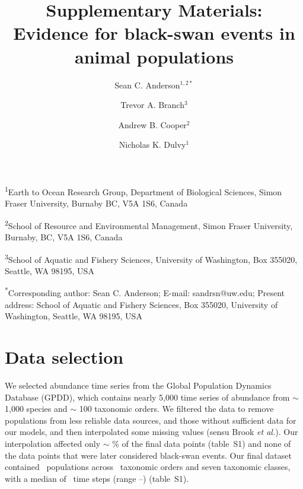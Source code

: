\documentclass[12pt]{article}
\title{Supplementary Materials:\\Evidence for black-swan events in animal
  populations}
\author{
Sean C. Anderson$^{1,2*}$ \and
Trevor A. Branch$^3$ \and
Andrew B. Cooper$^2$ \and
Nicholas K. Dulvy$^1$
}
\date{}
\begin{document}
\nocite{taleb2007,sornette2009}
\nocite{meehl2004,katz2005,ipcc2012}
\nocite{taleb2007,sornette2009,may2008}
\nocite{taleb2007}
\nocite{newman2005}
\nocite{sornette2009}
\nocite{harnik2012}
\nocite{fey2015}
\nocite{mangel1994}
\nocite{ipcc2012}
\nocite{keitt1998,allen2001,halley2002}
\nocite{brook2006a,knape2012}
\nocite{SOM}
\nocite{saucy1994}
\nocite{stafford1971}
\nocite{stafford1971}
\nocite{potts1980}
\nocite{potts1980}
\nocite{allen2001}
\nocite{schindler2010}
\nocite{carpenter2006}
\nocite{nunez2012}
\nocite{meehl2004,katz2005,ipcc2012}
\nocite{kirby2009}
\nocite{denny2009}
\nocite{nrc2007}
\nocite{caddy1996}
\nocite{schindler2010}
\nocite{doak2008,lindenmayer2010}
\nocite{mangel1994}
\nocite{loreau2010a,thompson2013}
\nocite{meehl2004,ipcc2012,thompson2013}
\nocite{rachev2008}


\maketitle

\textsuperscript{1}Earth to Ocean Research Group, Department of Biological
Sciences, Simon Fraser University, Burnaby BC, V5A 1S6, Canada

\textsuperscript{2}School of Resource and Environmental Management, Simon
Fraser University, Burnaby, BC, V5A 1S6, Canada

\textsuperscript{3}School of Aquatic and Fishery Sciences, University of
Washington, Box 355020, Seattle, WA 98195, USA

\textsuperscript{*}Corresponding author: Sean C. Anderson; E-mail: sandrsn@uw.edu; Present address: School of Aquatic and Fishery Sciences, Box 355020, University of Washington, Seattle, WA 98195, USA

\linenumbers
\onehalfspacing




\section{Data selection}

We selected abundance time series from the Global Population Dynamics Database\cite{gpdd2010} (GPDD), which contains nearly 5,000 time series of abundance from \(\sim\) 1,000 species and \(\sim\) 100 taxonomic orders. We filtered the data to remove populations from less reliable data sources, and those without sufficient data for our models, and then interpolated some missing values (sensu Brook \textit{et al.}\cite{brook2006a}). Our interpolation affected only \(\sim\) \interpPointsPerc \% of the final data points (table~S1) and none of the data points that were later considered black-swan events. Our final dataset contained \NPops\ populations across \NOrders\ taxonomic orders and seven taxonomic classes, with a median of \medianTimeSteps\ time steps (range \minTimeSteps--\maxTimeSteps) (table~S1).
\end{document}
